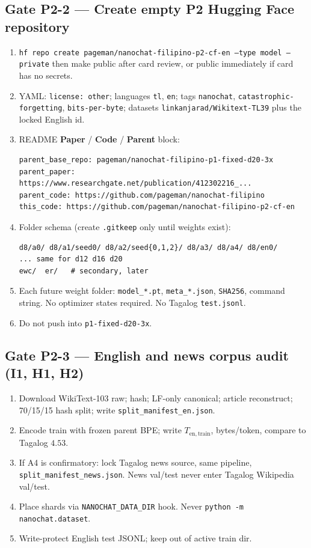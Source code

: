 \documentclass[11pt,a4paper]{article}
\begin{document}
\subsection{Gate P2-2 --- Create empty P2 Hugging Face repository}
\begin{enumerate}
\item \texttt{hf repo create pageman/nanochat-filipino-p2-cf-en --type model --private} then make public after card review, or public immediately if card has no secrets.
\item YAML: \texttt{license: other}; languages \texttt{tl}, \texttt{en}; tags \texttt{nanochat}, \texttt{catastrophic-forgetting}, \texttt{bits-per-byte}; datasets \texttt{linkanjarad/Wikitext-TL39} plus the locked English id.
\item README \textbf{Paper} / \textbf{Code} / \textbf{Parent} block:
\begin{verbatim}
parent_base_repo: pageman/nanochat-filipino-p1-fixed-d20-3x
parent_paper: https://www.researchgate.net/publication/412302216_...
parent_code: https://github.com/pageman/nanochat-filipino
this_code: https://github.com/pageman/nanochat-filipino-p2-cf-en
\end{verbatim}
\item Folder schema (create \texttt{.gitkeep} only until weights exist):
\begin{verbatim}
d8/a0/ d8/a1/seed0/ d8/a2/seed{0,1,2}/ d8/a3/ d8/a4/ d8/en0/
... same for d12 d16 d20
ewc/  er/   # secondary, later
\end{verbatim}
\item Each future weight folder: \texttt{model\_*.pt}, \texttt{meta\_*.json}, \texttt{SHA256}, command string. No optimizer states required. No Tagalog \texttt{test.jsonl}.
\item Do not push into \texttt{p1-fixed-d20-3x}.
\end{enumerate}

\subsection{Gate P2-3 --- English and news corpus audit (I1, H1, H2)}
\begin{enumerate}
\item Download WikiText-103 raw; hash; LF-only canonical; article reconstruct; 70/15/15 hash split; write \texttt{split\_manifest\_en.json}.
\item Encode train with frozen parent BPE; write $T_{\mathrm{en,train}}$, bytes/token, compare to Tagalog $4.53$.
\item If A4 is confirmatory: lock Tagalog news source, same pipeline, \texttt{split\_manifest\_news.json}. News val/test never enter Tagalog Wikipedia val/test.
\item Place shards via \texttt{NANOCHAT\_DATA\_DIR} hook. Never \texttt{python -m nanochat.dataset}.
\item Write-protect English test JSONL; keep out of active train dir.
\end{enumerate}
\end{document}
